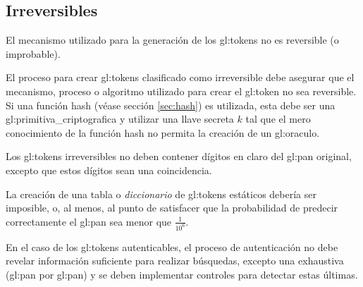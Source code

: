 %
%

\subsection{Irreversibles}

{
  El mecanismo utilizado para la generación de los \glspl{gl:token}
  no es reversible (o improbable).

  {
    El proceso para crear \glspl{gl:token} clasificado como irreversible
    debe asegurar que el mecanismo, proceso o algoritmo utilizado para
    crear el \gls{gl:token} no sea reversible. Si una función hash (véase
    sección \ref{sec:hash}) es utilizada, esta debe ser una
    \gls{gl:primitiva_criptografica} y utilizar una llave secreta $k$ tal que
    el mero conocimiento de la función hash no permita la creación de un
    \gls{gl:oraculo}.
  }

  {
    Los \glspl{gl:token} irreversibles no deben contener dígitos en claro del
    \gls{gl:pan} original, excepto que estos dígitos sean una coincidencia.
  }

  {
    La creación de una tabla o \textit{diccionario} de \glspl{gl:token}
    estáticos debería ser imposible, o, al menos, al punto de satisfacer que
    la probabilidad de predecir correctamente el \gls{gl:pan} sea menor que
    $\frac{1}{10^6}$.
  }

  {
    En el caso de los \glspl{gl:token} autenticables, el proceso de
    autenticación no debe revelar información suficiente para realizar
    búsquedas, excepto una exhaustiva (\gls{gl:pan} por \gls{gl:pan}) y se
    deben implementar controles para detectar estas últimas.
  }
}

